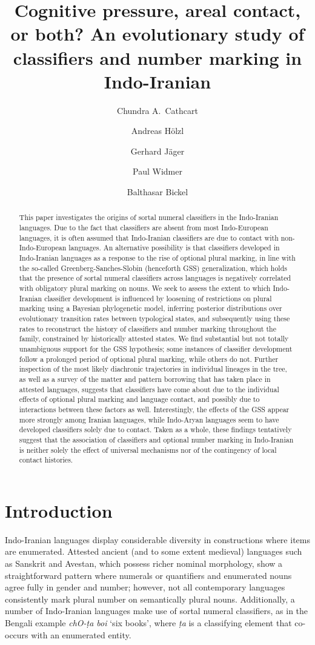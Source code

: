 \documentclass[11pt]{article}
\title{Cognitive pressure, areal contact, or both? An evolutionary study of classifiers and number marking in Indo-Iranian}
\author[1,2]{Chundra A.\ Cathcart}
\author[1,2]{Andreas H\"olzl}
\author[3]{Gerhard J\"ager}
\author[1,2]{Paul Widmer}
\author[1,2]{Balthasar Bickel}
\affil[1]{Department of Comparative Language Sciences, University of Zurich}
\affil[2]{Center for the Interdisciplinary Study of Language Evolution, University of Zurich}
\affil[3]{Department of Linguistics, University of T\"ubingen}
\date{}
\begin{document}
\maketitle
\sloppy

\begin{abstract}
\noindent This paper investigates the origins of sortal numeral classifiers in the Indo-Iranian languages. 
Due to the fact that classifiers are absent from most Indo-European languages, it is often assumed that Indo-Iranian classifiers are due to contact with non-Indo-European languages. 
An alternative possibility is that classifiers developed in Indo-Iranian languages as a response to the rise of optional plural marking, in line with the so-called Greenberg-Sanches-Slobin (henceforth GSS) generalization, which holds that the presence of sortal numeral classifiers across languages is negatively correlated with obligatory plural marking on nouns. 
We seek to assess the extent to which Indo-Iranian classifier development is influenced by loosening of restrictions on plural marking using a Bayesian phylogenetic model, inferring posterior distributions over evolutionary transition rates between typological states, and subsequently using these rates to reconstruct the history of classifiers and number marking throughout the family, constrained by historically attested states. 
We find substantial but not totally unambiguous support for the GSS hypothesis; some instances of classifier development follow a prolonged period of optional plural marking, while others do not. 
Further inspection of the most likely diachronic trajectories in individual lineages in the tree, as well as a survey of the matter and pattern borrowing that has taken place in attested languages, suggests that classifiers have come about due to the individual effects of optional plural marking and language contact, and possibly due to interactions between these factors as well. 
Interestingly, the effects of the GSS appear more strongly among Iranian languages, while Indo-Aryan languages seem to have developed classifiers solely due to contact. 
Taken as a whole, these findings tentatively suggest that the association of classifiers and optional number marking in Indo-Iranian is neither solely the effect of universal mechanisms nor of the contingency of local contact histories. 
\end{abstract}

\section{Introduction}
Indo-Iranian languages display considerable diversity in constructions where items are enumerated. 
Attested ancient (and to some extent medieval) languages such as Sanskrit and Avestan, which possess richer nominal morphology, show a straightforward pattern where numerals or quantifiers and enumerated nouns agree fully in gender and number; however, not all contemporary languages consistently mark plural number on semantically plural nouns. 
Additionally, a number of Indo-Iranian languages make use of sortal numeral classifiers, as in the Bengali example {\it ch{\IPA O}-\d{t}a boi} `six books', where {\it \d{t}a} is a classifying element that co-occurs with an enumerated entity. 
\end{document}
